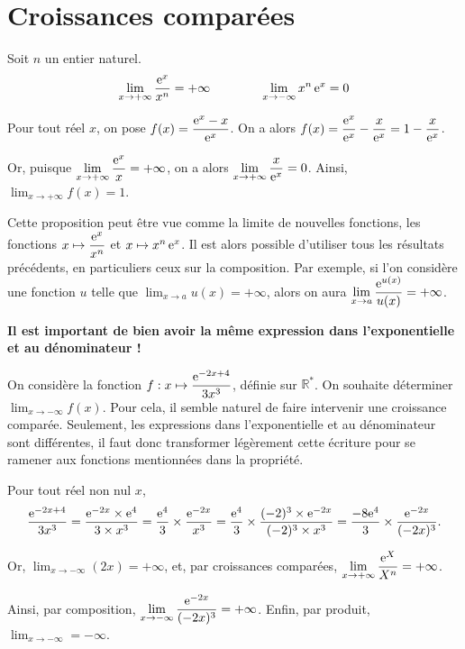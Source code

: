 \documentclass[11pt,fleqn, openany]{book} %
\begin{document}
\section{Croissances comparées}

\begin{proposition} Soit $n$ un entier naturel.
\[\displaystyle \lim_{x \to +\infty} \dfrac{\mathrm{e}^x}{x^n}=+\infty \qquad \qquad \displaystyle \lim_{x \to -\infty} x^n\,\mathrm{e}^x =0\]\end{proposition}


\begin{example} Pour tout réel $x$, on pose $f(x)=\dfrac{\mathrm{e}^x-x}{\mathrm{e}^x}$. On a alors $f(x)=\dfrac{\mathrm{e}^x}{\mathrm{e}^x}-\dfrac{x}{\mathrm{e}^x}=1-\dfrac{x}{\mathrm{e}^x}$.

Or, puisque $\displaystyle \lim_{x \to +\infty} \dfrac{\mathrm{e}^x}{x}=+\infty$, on a alors $\displaystyle \lim_{x \to +\infty} \dfrac{x}{\mathrm{e}^x}=0$. Ainsi, $\displaystyle \lim_{x \to +\infty} f(x)=1$.\end{example}

Cette proposition peut être vue comme la limite de nouvelles fonctions, les fonctions $x\mapsto \dfrac{\mathrm{e}^x}{x^n}$ et $x\mapsto x^n\,\mathrm{e}^x$. Il est alors possible d'utiliser tous les résultats précédents, en particuliers ceux sur la composition. Par exemple, si l'on considère une fonction $u$ telle que $\displaystyle\lim_{x \to a}u(x)=+\infty$, alors on aura $\displaystyle\lim_{x \to a}\dfrac{\mathrm{e}^{u(x)}}{u(x)}=+\infty$.

\textbf{Il est important de bien avoir la même expression dans l'exponentielle et au dénominateur !}

\begin{example}On considère la fonction $f : x\mapsto \dfrac{\mathrm{e}^{-2x+4}}{3x^3}$, définie sur $\mathbb{R}^*$. On souhaite déterminer $\displaystyle\lim_{x \to -\infty}f(x)$. Pour cela, il semble naturel de faire intervenir une croissance comparée. Seulement, les expressions dans l'exponentielle et au dénominateur sont différentes, il faut donc transformer légèrement cette écriture pour se ramener aux fonctions mentionnées dans la propriété.

Pour tout réel non nul $x$, 
\[\dfrac{\mathrm{e}^{-2x+4}}{3x^3} = \dfrac{\mathrm{e}^{-2x} \times \mathrm{e}^{4}}{3 \times x^3}=\dfrac{\mathrm{e}^4}{3} \times \dfrac{\mathrm{e}^{-2x}}{x^3}=\dfrac{\mathrm{e}^4}{3} \times \dfrac{(-2)^3 \times \mathrm{e}^{-2x}}{(-2)^3 \times x^3} = \dfrac{-8\mathrm{e}^4}{3} \times \dfrac{\mathrm{e}^{-2x}}{(-2x)^3}.\]

Or, $\displaystyle\lim_{x \to - \infty}(2x)=+\infty$, et, par croissances comparées, $\displaystyle \lim_{x \to +\infty} \dfrac{\mathrm{e}^X}{X^n}=+\infty$. 

Ainsi, par composition, $\displaystyle \lim_{x \to -\infty} \dfrac{\mathrm{e}^{-2x}}{(-2x)^3}=+\infty$. Enfin, par produit, $\displaystyle \lim_{x \to -\infty}=-\infty$.\end{example}
\end{document}
